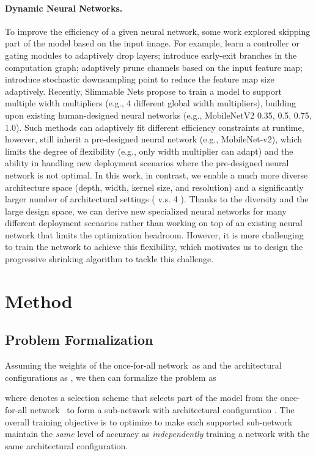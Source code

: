 \documentclass{article} \usepackage{iclr2020_conference,times}
\newcommand{\myparagraph}[1]{\vspace{-3pt}\paragraph{#1}}
\newcommand{\motherNet}{once-for-all network}
\begin{document}
\myparagraph{Dynamic Neural Networks.} 
To improve the efficiency of a given neural network, some work explored skipping part of the model based on the input image. For example, \cite{wu2018blockdrop,liu2018dynamic,wang2018skipnet} learn a controller or gating modules to adaptively drop layers; \cite{huang2017multi} introduce early-exit branches in the computation graph;
\cite{lin2017runtime} adaptively prune channels based on the input feature map; \cite{kuen2018stochastic} introduce stochastic downsampling point to reduce the feature map size adaptively. Recently, Slimmable Nets \citep{yu2018slimmable,yu2019universally} propose to train a model to support multiple width multipliers (e.g., 4 different global width multipliers), building upon existing human-designed neural networks (e.g., MobileNetV2 0.35, 0.5, 0.75, 1.0). Such methods can adaptively fit different efficiency constraints at runtime, however, still inherit a pre-designed neural network (e.g., MobileNet-v2), which limits the degree of flexibility (e.g., only width multiplier can adapt) and the ability in handling new deployment scenarios where the pre-designed neural network is not optimal. In this work, in contrast, we enable a much more diverse architecture space (depth, width, kernel size, and resolution) and a significantly larger number of architectural settings ( v.s. 4 \citep{yu2018slimmable}). Thanks to the diversity and the large design space, we can derive new specialized neural networks for many different deployment scenarios rather than working on top of an existing neural network that limits the optimization headroom. However, it is more challenging to train the network to achieve this flexibility, which motivates us to design the progressive shrinking algorithm to tackle this challenge.  
\section{Method}

\subsection{Problem Formalization}
Assuming the weights of the \motherNet~as  and the architectural configurations as , we then can formalize the problem as 

where  denotes a selection scheme that selects part of the model from the \motherNet~ to form a sub-network with architectural configuration . The overall training objective is to optimize  to make each supported sub-network maintain the \textit{same} level of accuracy as \textit{independently} training a network with the same architectural configuration.
\end{document}
